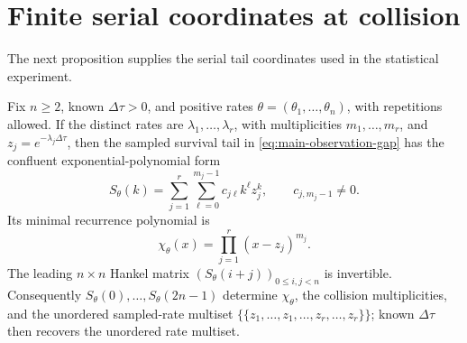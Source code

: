 \section{Finite serial coordinates at collision}
\label{sec:serial-coordinates-main}

The next proposition supplies the serial tail coordinates used in the
statistical experiment.

\begin{proposition}
\label{prop:serial-tail-coordinates-main}
Fix \(n\ge2\), known \(\Delta\tau>0\), and positive rates
\(\theta=(\theta_1,\ldots,\theta_n)\), with repetitions allowed.  If the
distinct rates are \(\lambda_1,\ldots,\lambda_r\), with multiplicities
\(m_1,\ldots,m_r\), and \(z_j=e^{-\lambda_j\Delta\tau}\), then the sampled
survival tail in \eqref{eq:main-observation-gap} has the confluent exponential-polynomial form
\begin{equation}
 S_\theta(k)=\sum_{j=1}^r\sum_{\ell=0}^{m_j-1}
 c_{j\ell}k^\ell z_j^k,\qquad c_{j,m_j-1}\ne0.
\label{eq:main-confluent-tail}
\end{equation}
Its minimal recurrence polynomial is
\begin{equation}
 \chi_\theta(x)=\prod_{j=1}^r(x-z_j)^{m_j}.
\label{eq:main-recurrence-polynomial}
\end{equation}
The leading \(n\times n\) Hankel matrix
\((S_\theta(i+j))_{0\le i,j<n}\) is invertible.  Consequently
\(S_\theta(0),\ldots,S_\theta(2n-1)\) determine \(\chi_\theta\), the
collision multiplicities, and the unordered sampled-rate multiset
\(\{\!\{z_1,\ldots,z_1,\ldots,z_r,\ldots,z_r\}\!\}\); known
\(\Delta\tau\) then recovers the unordered rate multiset.
\end{proposition}

